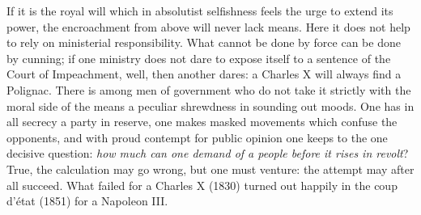 \documentclass[12pt,a4paper,openany]{book}
\newcommand{\opage}[1]{\marginnote{\footnotesize\textit{[#1]}}}
\begin{document}
If it is the royal will which in absolutist selfishness
feels the urge to extend its power, the encroachment from
above will never lack means. Here it does not help to
rely on ministerial responsibility. What cannot
be done by force can be done by cunning; if one ministry does not dare
to expose itself to a sentence of the Court of Impeachment, well, then another
dares: a Charles X will always find a Polignac. There
is among men of government who do not take it strictly with
\setcounter{footnote}{0}%
\opage{28}the moral side of the means a peculiar shrewdness in sounding out
moods. One has in all secrecy a party in
reserve, one makes masked movements which confuse
the opponents, and with proud contempt for
public opinion one keeps to the one decisive question:
\emph{how much can one demand of a people before it
rises in revolt}? True, the calculation may go wrong, but
one must venture: the attempt may after all succeed. What
failed for a Charles X (1830) turned out happily
in the coup d'état (1851) for a Napoleon III.
\end{document}
